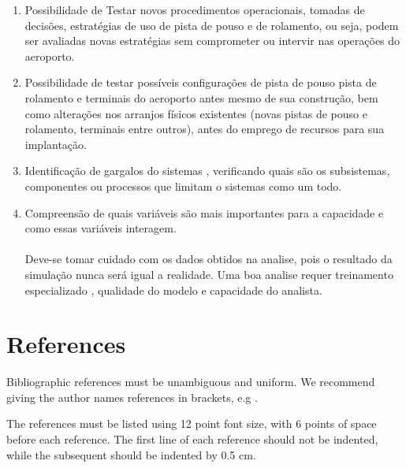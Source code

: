 \documentclass[12pt]{article}
\begin{document}
\begin{enumerate}

\item Possibilidade de Testar novos procedimentos operacionais, tomadas
 de decisões, estratégias de uso de pista de pouso e de rolamento, ou seja,
 podem ser avaliadas novas estratégias sem comprometer ou intervir nas 
 operações do aeroporto.

\item Possibilidade de testar possíveis configurações de pista de pouso
  pista de rolamento e terminais do aeroporto antes mesmo de sua construção, 
  bem como alterações nos arranjos físicos existentes (novas pistas de pouso
  e rolamento, terminais entre outros), antes do emprego de recursos para
  sua implantação.

\item Identificação de gargalos do sistemas , verificando quais são os 
  subsistemas, componentes ou processos que limitam o sistemas como um
  todo.

\item Compreensão de quais variáveis são mais importantes para a capacidade
e como essas variáveis interagem.

\paragraph{}%
Deve-se tomar cuidado com os dados obtidos na analise, pois o resultado 
da simulação nunca será igual a realidade. Uma boa analise requer 
treinamento especializado , qualidade do modelo e capacidade do analista.

\end{enumerate}

\section{References}

Bibliographic references must be unambiguous and uniform.  We recommend giving
the author names references in brackets, e.g \cite{boulic:91}.

The references must be listed using 12 point font size, with 6 points of space
before each reference. The first line of each reference should not be
indented, while the subsequent should be indented by 0.5 cm.



\end{document}
